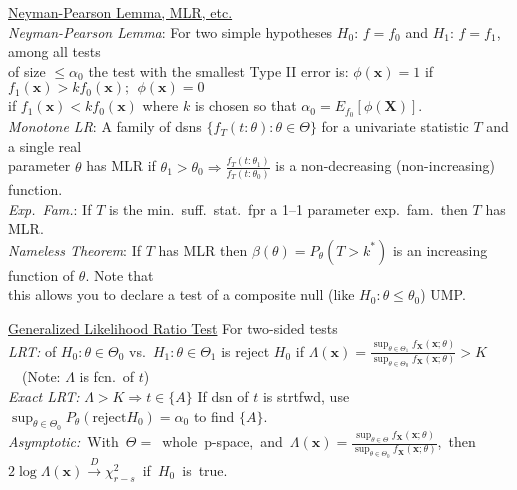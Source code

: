 \documentclass[11pt]{article}
\newcommand{\vecX}{\ensuremath{\mathbf{X}}}
\newcommand{\vecx}{\ensuremath{\mathbf{x}}}
\begin{document}
\indent\underline{Neyman-Pearson Lemma, MLR, etc.}\\
{\it Neyman-Pearson Lemma}: For two simple hypotheses $H_0$: $f=f_0$ and $H_1$: $f=f_1$,
among all tests\\
\hspace*{1.5em}of size $\leq \alpha_0$ the test with the smallest Type II error is:
$\phi(\vecx)=1$ if $f_1(\vecx)>kf_0(\vecx);\ \ \phi(\vecx)=0$ \\
\hspace*{1.5em}if $f_1(\vecx)<kf_0(\vecx)$ where $k$ is chosen so that $\alpha_0
= E_{f_0}[\phi(\vecX)]$.\\
%
{\it Monotone LR}: A family of dsns $\{f_T(t:\theta): \theta \in \Theta\}$ for a univariate
statistic $T$ and a single real \\
\hspace*{1.5em}parameter $\theta$ has MLR if $\theta_1 > \theta_0
\Longrightarrow \frac{f_T(t:\theta_1)}{f_T(t:\theta_0)}$ is a non-decreasing (non-increasing)
function.\\
%
{\it Exp.\ Fam.}:  If $T$ is the min.\ suff.\ stat.\ fpr a 1--1 parameter exp.\ fam.\ then $T$ has
MLR.\\
%
{\it Nameless Theorem}:  If  $T$ has MLR then $\beta(\theta) = P_\theta(T>k^*)$
is an increasing function of $\theta$.  Note that \\
\hspace*{1.5em}this allows you to declare a test of a composite
null (like $H_0:\theta\leq \theta_0$) UMP.

\indent\underline{Generalized Likelihood Ratio Test} For two-sided tests \\
{\it LRT:} of $H_0:\theta\in\Theta_0$ vs.\ $H_1:\theta\in\Theta_1$ is reject $H_0$ if 
$\Lambda(\vecx)=\frac{\sup_{\theta\in\Theta_1}
f_\vecX(\vecx;\theta)}{\sup_{\theta\in\Theta_0} f_\vecX(\vecx;\theta)} > K$\ \ (Note: $\Lambda$
is fcn.\ of $t$)\\
%
{\it Exact LRT:} $\Lambda>K\Rightarrow t\in\{A\}$  If dsn of $t$ is
strtfwd, use $\sup_{\theta\in\Theta_0}P_\theta(\mathrm{reject} H_0) = \alpha_0$ to find
$\{A\}$.\\
% 
\mbox{{\it Asymptotic:} With $\Theta =$ whole p-space, and $\Lambda(\vecx)
=\frac{\sup_{\theta\in\Theta} f_\vecX(\vecx;\theta)}{\sup_{\theta\in\Theta_0}
f_\vecX(\vecx;\theta)}$,  then $2\log\Lambda(\vecx)\stackrel{D}{\longrightarrow}\chi^2_{r-s}$ if
$H_0$ is true.}
\end{document}
